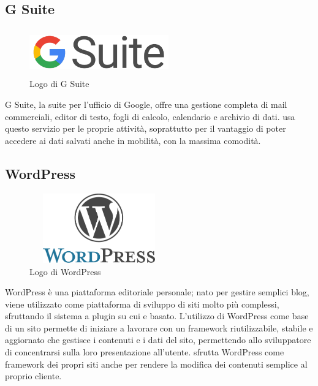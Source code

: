    \subsection{G Suite}
   \begin{figure}[H]
      \begin{center}
         \includegraphics[width=6cm,height=2cm,keepaspectratio]{immagini/gsuite-logo}
      \end{center}
      \caption{Logo di G Suite}\label{logogsuite}
   \end{figure}
   G Suite, la suite per l'ufficio di Google, offre una gestione completa di mail commerciali, editor di testo, fogli di calcolo, calendario e archivio di dati. \nomeAzienda{} usa questo servizio per le proprie attività, soprattutto per il vantaggio di poter accedere ai dati salvati anche in mobilità, con la massima comodità.

   \subsection{WordPress}
   \begin{figure}[H]
      \begin{center}
         \includegraphics[width=6cm,height=3cm,keepaspectratio]{immagini/wordpress-logo}
      \end{center}
      \caption{Logo di WordPress}\label{logowordpress}
   \end{figure}
   WordPress è una piattaforma editoriale personale; nato per gestire semplici blog, viene utilizzato come piattaforma di sviluppo di siti molto più complessi, sfruttando il sistema a plugin su cui e basato. L'utilizzo di WordPress come base di un sito permette di iniziare a lavorare con un framework riutilizzabile, stabile e aggiornato che gestisce i contenuti e i dati del sito, permettendo allo sviluppatore di concentrarsi sulla loro presentazione all'utente.
   \nomeAzienda{} sfrutta WordPress come framework dei propri siti anche per rendere la modifica dei contenuti semplice al proprio cliente.

